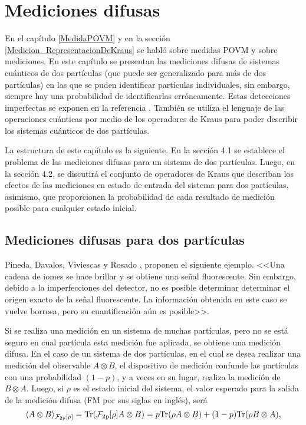 \chapter{Mediciones difusas}


En el capítulo {\ref{MedidaPOVM}} y en la sección {\ref{Medicion_RepresentacionDeKraus}} se habló sobre medidas POVM y sobre mediciones. En este capítulo se presentan las mediciones difusas de sistemas cuánticos de dos partículas (que puede ser generalizado para más de dos partículas) en las que se puden identificar partículas individuales, sin embargo, siempre hay una probabilidad de identificarlas erróneamente. Estas detecciones imperfectas se exponen en la referencia {\cite{Pineda_2021}}. También se utiliza el lenguaje de las operaciones cuánticas por medio de los operadores de Kraus para poder describir los sistemas cuánticos de dos partículas.

La estructura de este capítulo es la siguiente. En la sección 4.1 se establece el problema de las mediciones difusas para un sistema de dos partículas. Luego, en la sección 4.2, se discutirá el conjunto de operadores de Kraus que describan los efectos de las mediciones en estado de entrada del sistema para dos partículas, asimismo, que proporcionen la probabilidad de cada resultado de medición posible para cualquier estado inicial.



\section{Mediciones difusas para dos partículas}

Pineda, Davalos, Viviescas y Rosado {\cite{Pineda_2021}}, proponen el siguiente ejemplo. <<Una cadena de iomes se hace brillar  y se obtiene una señal fluorescente. Sin embargo, debido a la imperfecciones del detector, no es posible determinar
determinar el origen exacto de la señal fluorescente. La información obtenida en este caso se vuelve borrosa, pero su cuantificación aún es posible>>.

Si se  realiza una  medición en un sistema de muchas partículas, pero no se está seguro en cual partícula esta medición fue aplicada, se obtiene una medición difusa. En el caso de un sistema de dos partículas, en el cual se desea realizar una medición del observable $A\otimes B$, el dispositivo de medición confunde las partículas con una probabilidad $(1-p)$, y a veces en su lugar, realiza la medición de $B\otimes A$. Luego, si $\rho$ es el estado inicial del sistema, el valor esperado para la salida de la medición difusa (FM por sus siglas en inglés), será   \[\langle A\otimes B\rangle_{\mathcal{F_{\text{2p}}[\rho]}}={\rm Tr}(\mathcal{F_{\text{2p}}[\rho]}A\otimes B)=p{\rm Tr}(\rho A\otimes B)+(1-p){\rm Tr}(\rho B\otimes A),\]


